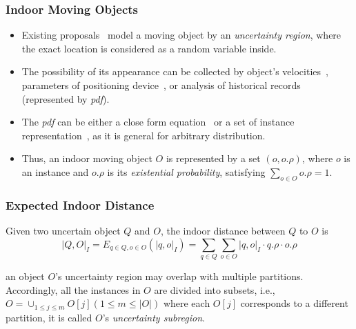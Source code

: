 
\begin{frame}
\frametitle{Indoor Moving Objects}

\begin{itemize}
  \item Existing proposals~\cite{pfoser1999capturing, DBLP:conf/edbt/YangLJ10} model a moving object by an \emph{uncertainty region}, where the exact location is considered as a random variable inside.
  \item The possibility of its appearance can be collected by object's velocities~\cite{DBLP:conf/edbt/YangLJ10}, parameters of positioning device~\cite{pfoser1999capturing}, or analysis of historical records (represented by \emph{pdf}).
  \item The \emph{pdf} can be either a close form equation~\cite{cheng2003evaluating,cheng2004querying} or a set of instance representation~\cite{kriegel2007probabilistic}, as it is general for arbitrary distribution.
  \item Thus, an indoor moving object $O$ is represented by a set ${(o, o.\rho)}$, where $o$ is an instance and $o.\rho$ is its \emph{existential probability}, satisfying $\sum_{o \in O}o.\rho = 1$.
\end{itemize}

\end{frame}


\begin{frame}
\frametitle{Expected Indoor Distance}

\begin{definition}
  Given two uncertain object $Q$ and $O$, the indoor distance between $Q$ to $O$ is
  \begin{equation}
    |Q, O|_{I} = E_{q \in Q, o \in O}(|q,o|_{I}) = \sum_{q \in Q}\sum_{o \in O}|q,o|_{I} \cdot q.\rho \cdot o.\rho
  \end{equation}
\end{definition}
\vspace{10pt}
an object $O$'s uncertainty region may overlap with multiple partitions. Accordingly, all the instances in $O$ are divided into subsets, i.e., $O = \cup_{1 \leq j \leq m}O[j](1 \leq m \leq |O|)$ where each $O[j]$ corresponds to a different partition, it is called $O$'s \emph{uncertainty subregion}.

\end{frame}

